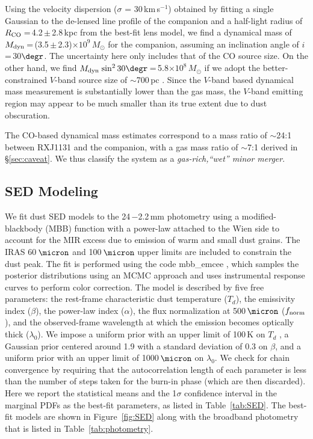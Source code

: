 \documentclass[]{emulateapj}
\newcommand{\Msun}{\mbox{$M_{\odot}$}\xspace}
\newcommand{\kms}{\mbox{km\,s$^{-1}$}\xspace}
\newcommand{\E}[1]{\mbox{$\times10^{#1}$}}
\newcommand{\eq}{\,=\,}
\newcommand{\pmm}{\,$\pm$\,}
\newcommand{\Fig}[1]{Figure~\ref{fig:#1}}
\newcommand{\Tab}[1]{Table~\ref{tab:#1}}
\newcommand{\Sec}[1]{\S\ref{sec:#1}}
\newcommand{\ncode}[1]{{\sc #1}}
\begin{document}
Using the velocity dispersion ($\sigma$ = 30\,\kms) obtained by fitting a single Gaussian to the
de-lensed line profile of the companion and a
half-light radius of $R_{\rm CO}$\,=\,4.2\pmm2.8\,kpc from the best-fit lens model,
we find a dynamical mass of
$M_{\rm dyn}$\,=\,(3.5\pmm2.3)\E{9}\,\Msun for the companion,
assuming an inclination angle of $i$\eq30$\degr$.
The uncertainty here only includes that of the CO source size.
On the other hand,
we find $M_{\rm dyn}$\,$\sin^2 30\degr$\,=\,5.8\E{8}\,\Msun
if we adopt the better-constrained $V$-band source size of $\sim$700\,pc .
Since the $V$-band based dynamical mass measurement is substantially lower than the gas mass,
the $V$-band emitting region may appear to be much smaller than its true extent due
to dust obscuration.

The CO-based dynamical mass estimates correspond to a mass ratio of $\sim$24:1
between RXJ1131 and the companion, with a gas mass ratio of $\sim$7:1 derived in  \Sec{caveat}.
We thus classify the system as a {\em gas-rich,``wet'' minor merger}.


\subsection{SED Modeling} \label{sec:SED}
We fit dust SED models to the 24\,\micron$-$2.2\,mm photometry
using a modified-blackbody (MBB)
function with a power-law attached to the Wien side to account for the MIR excess due to
emission of warm and small dust grains.
The IRAS 60\,$\micron$ and 100\,$\micron$ upper limits are included to constrain the dust peak.
The fit is performed using the code
\ncode{mbb\_emcee} \citep[e.g.,][]{Riechers13a,Dowell14a}, which samples the posterior
distributions using an MCMC approach and uses instrumental
response curves to perform color correction.
The model is described by five free parameters: the rest-frame characteristic dust
temperature ($T_{d}$), the emissivity index ($\beta$), the power-law index
($\alpha$), the flux normalization at 500\,$\micron$ ($f_{\rm norm}$), and
the observed-frame wavelength at which the emission
becomes optically thick ($\lambda_{0}$). We impose
a uniform prior with an upper limit of 100\,K on $T_d$ \citep[see e.g.,][]{Sajina12a},
a Gaussian prior centered around
1.9 with a standard deviation of 0.3 on $\beta$, and a uniform prior with an upper limit of
1000\,$\micron$ on $\lambda_0$.
We check for chain convergence by requiring that the autocorrelation
length of each parameter is less than the number of steps
taken for the burn-in phase (which are then discarded).
Here we report the statistical means
and the 1$\sigma$ confidence interval in the marginal PDFs
as the best-fit parameters, as listed in \Tab{SED}.
The best-fit models are shown in \Fig{SED} along with the broadband photometry that is listed in \Tab{photometry}.
\end{document}
